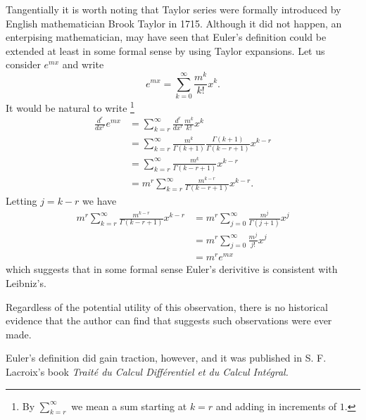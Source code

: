 \documentclass{unswmaths}
\begin{document}
Tangentially it is worth noting that Taylor series were formally introduced
by English mathematician Brook Taylor in 1715. Although it did not happen,
an enterpising mathematician, may have seen that Euler's definition could be
extended at least in some formal sense by using Taylor expansions.
Let us consider $ e^{mx} $ and write
$$
    e^{mx} = \sum_{k = 0}^\infty \frac{m^k}{k!} x^k.
$$
It would be natural to write \footnote{By $ \sum_{k = r}^\infty $ we mean a sum starting at $ k = r $ and adding in increments of $ 1 $. }
\begin{align}
    \label{eq:Euler_Leibniz_Sum}
    \frac{d^r}{dx^r} e^{mx} &= \sum_{k = r}^\infty \frac{d^r}{dx^r} \frac{m^k}{k!} x^k \\
                            &= \sum_{k = r}^\infty \frac{m^k}{\Gamma(k+1)} \frac{\Gamma(k+1)}{\Gamma(k - r + 1)} x^{k-r} \nonumber \\             
                            &= \sum_{k = r}^\infty \frac{m^k}{\Gamma(k - r + 1)}x^{k-r} \nonumber \\
                            &= m^r \sum_{k = r}^\infty \frac{m^{k-r}}{\Gamma(k - r + 1)}x^{k-r}. \nonumber
\end{align}
Letting $ j = k - r $ we have
\begin{align*}
    m^r \sum_{k = r}^\infty \frac{m^{k-r}}{\Gamma(k - r + 1)}x^{k-r}
        &= m^r \sum_{j = 0}^\infty \frac{m^{j}}{\Gamma(j + 1)}x^{j} \\
        &= m^r \sum_{j = 0}^\infty \frac{m^{j}}{j!}x^{j} \\
        &= m^r e^{mx}
\end{align*}
which suggests that in some formal sense Euler's derivitive is consistent with Leibniz's.

Regardless of the potential utility  of this observation, there is no historical evidence that the author
can find that suggests such observations were ever made.

Euler's definition did gain traction, however, and it was published in S. F. Lacroix's  book
\emph{Trait\'{e} du Calcul Diff\'{e}rentiel et du Calcul Int\'{e}gral.}
\end{document}
